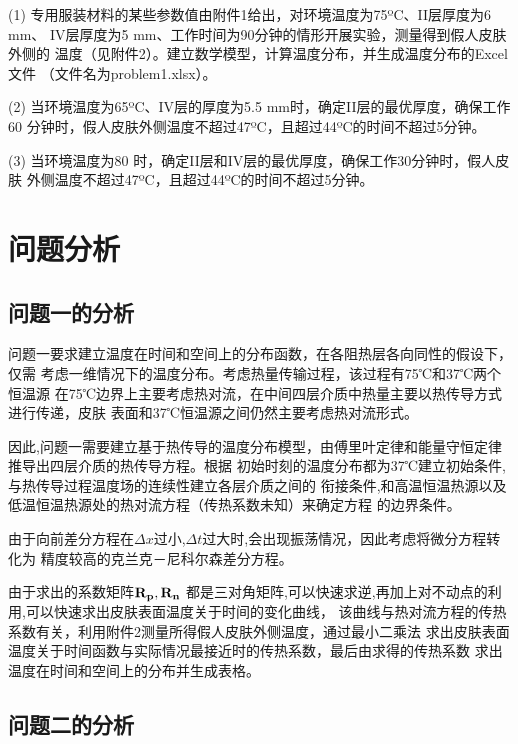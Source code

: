 \documentclass{cumcmthesis}
\begin{document}
        (1) 专用服装材料的某些参数值由附件1给出，对环境温度为75ºC、II层厚度为6 mm、
        IV层厚度为5 mm、工作时间为90分钟的情形开展实验，测量得到假人皮肤外侧的
        温度（见附件2）。建立数学模型，计算温度分布，并生成温度分布的Excel文件
        （文件名为problem1.xlsx）。

        (2) 当环境温度为65ºC、IV层的厚度为5.5 mm时，确定II层的最优厚度，确保工作60
        分钟时，假人皮肤外侧温度不超过47ºC，且超过44ºC的时间不超过5分钟。
    
        (3) 当环境温度为80 时，确定II层和IV层的最优厚度，确保工作30分钟时，假人皮肤
        外侧温度不超过47ºC，且超过44ºC的时间不超过5分钟。
\section{问题分析}
    \subsection{问题一的分析}

        问题一要求建立温度在时间和空间上的分布函数，在各阻热层各向同性的假设下，仅需
        考虑一维情况下的温度分布。考虑热量传输过程，该过程有75℃和37℃两个恒温源
        在75℃边界上主要考虑热对流，在中间四层介质中热量主要以热传导方式进行传递，皮肤
        表面和37℃恒温源之间仍然主要考虑热对流形式。
        
        因此,问题一需要建立基于热传导的温度分布模型，由傅里叶定律和能量守恒定律推导出四层介质的热传导方程。根据
        初始时刻的温度分布都为37℃建立初始条件,与热传导过程温度场的连续性建立各层介质之间的
        衔接条件,和高温恒温热源以及低温恒温热源处的热对流方程（传热系数未知）来确定方程
        的边界条件。
        
        由于向前差分方程在\(\Delta x\)过小,\(\Delta t\)过大时,会出现振荡情况，因此考虑将微分方程转化为
        精度较高的克兰克－尼科尔森差分方程\cite{wiki}。
        
        由于求出的系数矩阵\(\bf{R_p},\bf{R_n}\)
        都是三对角矩阵,可以快速求逆,再加上对不动点的利用,可以快速求出皮肤表面温度关于时间的变化曲线，
        该曲线与热对流方程的传热系数有关，利用附件2测量所得假人皮肤外侧温度，通过最小二乘法
        求出皮肤表面温度关于时间函数与实际情况最接近时的传热系数，最后由求得的传热系数
        求出温度在时间和空间上的分布并生成表格。

    \subsection{问题二的分析}
\end{document}
